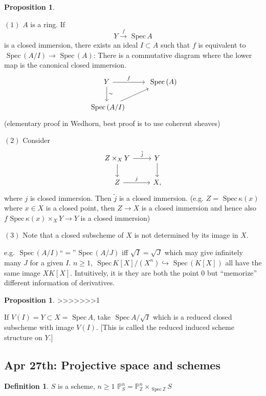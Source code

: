 \documentclass[11pt]{article}
\theoremstyle{definition}
\newtheorem{prop}[thm]{Proposition}
\newtheorem{dfn}[thm]{Definition}
\newcommand{\spec}{\text{ Spec}\,}
\newcommand{\proj}{\mathbb P}
\newcommand{\intg}{\mathbb Z}
\newcommand{\lrta}{\longrightarrow}
\newcommand{\inj}{\hookrightarrow}
\begin{document}
\begin{prop}\ 

$(1)$
$A$ is a ring. If 
$$
Y\overset{f}{\lrta} \spec A
$$ 
is a closed immersion, there exists an ideal $I\subset A$ such that $f$ is equivalent to $\spec(A/I)\lrta \spec (A)$: There is a commutative diagram where the lower map is the canonical closed immersion.
$$
\begin{tikzcd}
Y \arrow[r, "f"] \arrow[d, "\sim"] & \spec(A) \\
\spec(A/I) \arrow[ru] & 
\end{tikzcd}
$$
(elementary proof in Wedhorn, best proof is to use coherent sheaves)

$(2)$ Consider
$$
\begin{tikzcd}
Z\times_X Y \arrow[r, "\tilde{j}"] \arrow[d] & Y \arrow[d] \\
Z \arrow[r, "j"] & X,
\end{tikzcd}
$$ 
where $j$ is closed immersion. Then $\tilde{j}$ is a closed immersion. (e.g. $Z=\spec \kappa(x)$ where $x\in X$ is a closed point, then $Z\lrta X$ is a closed immersion and hence also $f\spec \kappa(x)\times_X Y\lrta Y$ is a closed immersion)

$(3)$ Note that a closed subscheme of $X$ is not determined by its image in $X$.

e.g. $\spec(A/I)$``$=$''$\spec (A/J)$ iff $\sqrt{I}=\sqrt{J}$ which may give  infinitely many $J$ for  a given $I$.
$n\geq 1$, $\spec K[X]/(X^n)\inj \spec(K[X])$ all have the same image $XK[X]$. Intuitively, it is they are both the point $0$ but ``memorize'' different information of derivatives.
\end{prop}

\begin{prop}
>>>>>>>1
\end{prop}
If $V(I)=Y\subset X=\spec A$, take $\spec A/\sqrt{I}$ which is a reduced closed subscheme with image $V(I)$. [This is called the reduced induced scheme structure on $Y$.]

\subsection{Apr 27th: Projective space and schemes}
\begin{dfn}
$S$ is a scheme, $n\geq 1$ $\proj^n_S=\proj^n_\intg\times_{\spec \intg} S$
\end{dfn}
\end{document}
